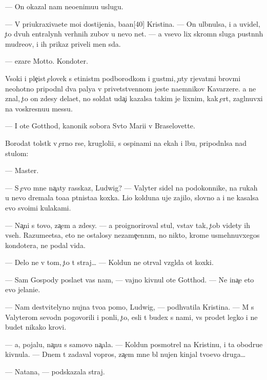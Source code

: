 \documentclass[10pt]{book}
\begin{document}
— On okazal nam neo{\q}enimu{\y}u uslugu.

— V{\yi} priukraxiva{\y}ete mo{\y}i dostijeni{\y}a, ba{\y}an[40] Kristina. — On ul{\yi}bnulsa, i {\y}a uvidel, {\c}to dvuh {\q}entralyn{\yi}h verhnih zubov u nevo net. — {\Y}a vsevo lix skromn{\yi}{\y} sluga pust{\yi}nn{\yi}h mudre{\q}ov, i ih prikaz{\yi} priveli men{\ia} s{\iu}da.

— {\C}ezare Motto. Kondot{\y}er.

V{\yi}soki{\y} i ple{\c}ist{\yi}{\y} {\c}elovek s {\x}etinist{\yi}m podborodkom i gust{\yi}mi, {\c}uty r{\yi}jevat{\yi}mi brov{\ia}mi neohotno pripodn{\ia}l dva paly{\q}a v privetstvennom jeste na{\y}emnikov Kavarzere. {\Y}a ne znal, {\c}to on zdesy dela{\y}et, no soldat uda{\c}i kazalsa takim je lixnim, kak {\c}ert, zagl{\ia}nuvxi{\y} na voskresnu{\y}u messu.

— I ote{\q} Gotthod, kanonik sobora Sv{\ia}to{\y} Mari{\y}i v Braselovette.

Borodat{\yi}{\y} tolst{\ia}k v {\c}erno{\y} r{\ia}se, krugloli{\q}i{\y}, s ospinami na {\x}ekah i lbu, pripodn{\ia}lsa nad stulom:

— Master.

— S {\c}evo mne na{\c}aty rasskaz, Ludwig? — Valyter sidel na podokonnike, na rukah u nevo dremala to{\x}a{\y}a p{\ia}tnista{\y}a koxka. Li{\q}o kolduna uje zajilo, slovno {\y}a i ne kasalsa {\y}evo svo{\y}imi kulakami.

— Na{\c}ni s tovo, za{\c}em {\y}a zdesy. — {\Y}a proignoriroval stul, vstav tak, {\c}tob{\yi} videty ih vseh. Razume{\y}etsa, eto ne ostalosy nezame{\c}enn{\yi}m, no nikto, krome usmehnuvxegos{\ia} kondot{\y}era, ne podal vida.

— Delo ne v tom, {\c}to t{\yi} straj… — Koldun ne otr{\yi}val vzgl{\ia}da ot koxki.

— Sam Gospody pos{\yi}la{\y}et vas nam, — vajno kivnul ote{\q} Gotthod. — Ne ina{\c}e eto {\y}evo jelani{\y}e.

— Nam de{\y}stvitelyno nujna tvo{\y}a pomo{\x}, Ludwig, — podhvatila Kristina. — M{\yi} s Valyterom sevodn{\ia} pogovorili i pon{\ia}li, {\c}to, {\y}esli t{\yi} budex s nami, vs{\e} pro{\y}det legko i ne budet nikako{\y} krovi.

— {\Y}a, pojalu{\y}, na{\c}nu s samovo na{\c}ala. — Koldun posmotrel na Kristinu, i ta obodr{\ia}{\y}u{\x}e kivnula. — Dnem t{\yi} zadaval vopros, za{\c}em mne b{\yi}l nujen kinjal tvo{\y}evo druga…

— Natana, — podskazala straj.
\end{document}
